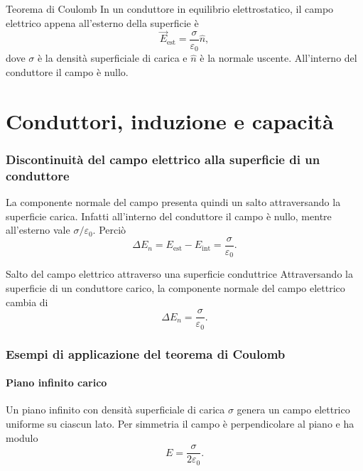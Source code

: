 \documentclass[a4paper]{article}
\begin{document}
\begin{snippettheorem}{Teorema di Coulomb}
    In un conduttore in equilibrio elettrostatico, il campo elettrico appena all'esterno della superficie è
    \[
        \vec{E}_{\mathrm{est}}=\frac{\sigma}{\varepsilon_0}\hat{n},
    \]
    dove \(\sigma\) è la densità superficiale di carica e \(\hat{n}\) è la normale uscente. All'interno del conduttore il campo è nullo.
\end{snippettheorem}

\pagebreak
\part{Conduttori, induzione e capacità}

\section{Discontinuità del campo elettrico alla superficie di un conduttore}

La componente normale del campo presenta quindi un salto attraversando la superficie carica. Infatti all'interno del conduttore il campo è nullo, mentre all'esterno vale \(\sigma/\varepsilon_0\). Perciò
\[
    \Delta E_n=E_{\mathrm{est}}-E_{\mathrm{int}}=\frac{\sigma}{\varepsilon_0}.
\]

\begin{snippetcorollary}{Salto del campo elettrico attraverso una superficie conduttrice}
    Attraversando la superficie di un conduttore carico, la componente normale del campo elettrico cambia di
    \[
        \Delta E_n=\frac{\sigma}{\varepsilon_0}.
    \]
\end{snippetcorollary}

\section{Esempi di applicazione del teorema di Coulomb}

\subsection{Piano infinito carico}

Un piano infinito con densità superficiale di carica \(\sigma\) genera un campo elettrico uniforme su ciascun lato. Per simmetria il campo è perpendicolare al piano e ha modulo
\[
    E=\frac{\sigma}{2\varepsilon_0}.
\]

\begin{center}
\end{center}
\end{document}
